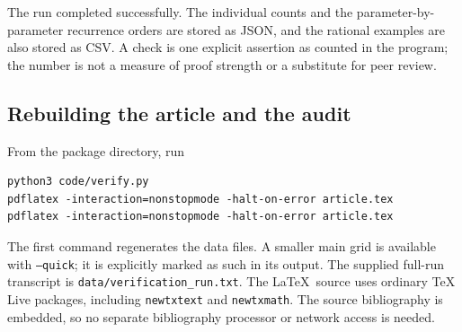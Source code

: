 \documentclass[11pt,a4paper]{article}
\numberwithin{equation}{section}
\theoremstyle{definition}
\theoremstyle{remark}
\begin{document}
The run completed successfully.  The individual counts and the
parameter-by-parameter recurrence orders are stored as JSON, and the
rational examples are also stored as CSV.  A check is one explicit
assertion as counted in the program; the number is not a measure of
proof strength or a substitute for peer review.

\noindent[Merge note: the recorded run is shipped as
\nolinkurl{data/03-cyclotomic-verification_summary.json} (status
\texttt{PASS} and the twenty counts behind the table; the table's
condensation row adds four counts of $63$, and its root-free row adds
$264+264+1{,}569$) and
\nolinkurl{data/03-cyclotomic-verification_run.txt} (the console
transcript); the parameter-by-parameter orders, the $264$ principal cases
with their multiplicities by residue class, as
\nolinkurl{data/03-cyclotomic-cyclotomic_orders.json}; and the rational
examples, the orders at $c=1,2,3$ and the generic order for
$t=1,\ldots,20$, as \nolinkurl{data/03-cyclotomic-orders_c1_c2_c3.csv}
(all-CRLF as written by Python's \texttt{csv} module).  All four were
delivered in \nolinkurl{data/} without the prefix.]

\subsection{Rebuilding the article and the audit}
From the package directory, run
\begin{lstlisting}
python3 code/verify.py
pdflatex -interaction=nonstopmode -halt-on-error article.tex
pdflatex -interaction=nonstopmode -halt-on-error article.tex
\end{lstlisting}
The first command regenerates the data files.  A smaller main grid is
available with \texttt{--quick}; it is explicitly marked as such in
its output.  The supplied full-run transcript is
\texttt{data/verification\_run.txt}.  The \LaTeX\ source uses ordinary
TeX Live packages, including \texttt{newtxtext} and \texttt{newtxmath}.
The source bibliography is embedded, so no separate bibliography
processor or network access is needed.
\end{document}

